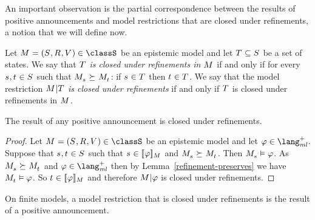 An important observation is the partial correspondence between the results of positive announcements and model restrictions that are closed under refinements, a notion that we will define now.

\begin{definition}\label{closed-under-refinements}
    Let $\kModelAndTuple \in \classS$ be an epistemic model and 
    let $\kStatesT \subseteq \kStates$ be a set of states.
    We say that {\em $\kStatesT$ is closed under refinements in $\kModel$} if and only if for every $\kStateS, \kStateT \in \kStates$ such that $\kPModel{\kStateS} \simulates \kPModel{\kStateT}$: if $\kStateS \in \kStatesT$ then $\kStateT \in \kStatesT$.
    We say that the model restriction {\em $\restrict{\kModel}{\kStatesT}$ is closed under refinements} if and only if $\kStatesT$ is closed under refinements in $\kModel$.
\end{definition}

\begin{lemma}\label{positive-announcements-refinement-closed}
    The result of any positive announcement is closed under refinements.
\end{lemma}

\begin{proof}
    Let $\kModelAndTuple \in \classS$ be an epistemic model and
    let $\phi \in \langMlPlus$.
    Suppose that $\kStateS, \kStateT \in \kStates$ such that $\kStateS \in \interpretation[\kModel]{\phi}$ and $\kPModel{\kStateS} \simulates \kPModel{\kStateT}$.
    Then $\kPModel{\kStateS} \entails \phi$.
    As $\kPModel{\kStateS} \simulates \kPModel{\kStateT}$ and $\phi \in \langMlPlus$ then by Lemma~\ref{refinement-preserves} we have $\kPModel{\kStateT} \entails \phi$.
    So $\kStateT \in \interpretation[\kModel]{\phi}$ and therefore $\restrict{\kModel}{\phi}$ is closed under refinements.
\end{proof}

\begin{lemma}\label{refinement-closed-positive-announcements}
    On finite models, a model restriction that is closed under refinements is the result of a positive announcement.
\end{lemma}

